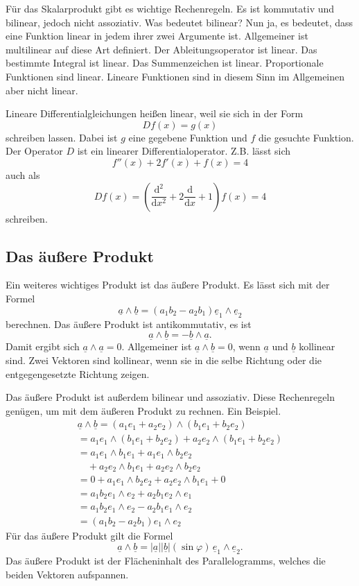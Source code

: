 \documentclass[a4paper,10pt,fleqn,twocolumn,twoside]{article}
\newcommand{\uv}[1]{\underline{#1}}
\begin{document}
Für das Skalarprodukt gibt es wichtige Rechenregeln. Es ist kommutativ
und bilinear, jedoch nicht assoziativ.
Was bedeutet bilinear? Nun ja, es bedeutet, dass eine Funktion linear
in jedem ihrer zwei Argumente ist. Allgemeiner ist multilinear auf
diese Art definiert. Der Ableitungsoperator ist linear. Das bestimmte
Integral ist linear. Das Summenzeichen ist linear. Proportionale
Funktionen sind linear. Lineare Funktionen sind in diesem Sinn im
Allgemeinen aber nicht linear.

Lineare Differentialgleichungen heißen linear,
weil sie sich in der Form
\[Df(x)=g(x)\]
schreiben lassen. Dabei ist $g$ eine gegebene Funktion und $f$
die gesuchte Funktion. Der Operator $D$ ist ein linearer
Differentialoperator. Z.B. lässt sich
\[f''(x) + 2f'(x) + f(x) = 4\]
auch als
\[Df(x) = \left(\frac{\mathrm d^2}{\mathrm dx^2}
+2\frac{\mathrm d}{\mathrm dx}
+1\right) f(x) = 4\]
schreiben.

\subsection{Das äußere Produkt}

Ein weiteres wichtiges Produkt ist das äußere Produkt.
Es lässt sich mit der Formel
\[\uv a\wedge\uv b
= (a_1b_2-a_2b_1)\uv e_1\wedge\uv e_2\]
berechnen. Das äußere Produkt ist antikommutativ, es ist
\[\uv a\wedge\uv b = -\uv b\wedge\uv a.\]
\noindent
Damit ergibt sich $\uv a\wedge\uv a = 0$.
Allgemeiner ist
$\uv a\wedge\uv b = 0$,
wenn $\uv a$ und $\uv b$ kollinear sind.
Zwei Vektoren sind kollinear, wenn sie in die selbe Richtung oder
die entgegengesetzte Richtung zeigen.

Das äußere Produkt ist außerdem bilinear und assoziativ.
Diese Rechenregeln genügen, um mit dem äußeren Produkt zu rechnen.
Ein Beispiel.
\begin{gather*}
\uv a\wedge\uv b
= (a_1e_1+a_2e_2) \wedge (b_1e_1+b_2e_2)\\
= a_1e_1\wedge (b_1e_1+b_2e_2) + a_2e_2\wedge (b_1e_1+b_2e_2)\\
= a_1e_1\wedge b_1e_1+a_1e_1\wedge b_2e_2\\
\quad + a_2e_2\wedge b_1e_1+a_2e_2\wedge b_2e_2\\
= 0+a_1e_1\wedge b_2e_2 + a_2e_2\wedge b_1e_1+0\\
= a_1b_2e_1\wedge e_2 + a_2b_1 e_2\wedge e_1\\
= a_1b_2e_1\wedge e_2 - a_2b_1 e_1\wedge e_2\\
= (a_1b_2-a_2b_1)e_1\wedge e_2
\end{gather*}
\noindent
Für das äußere Produkt gilt die Formel
\[\uv a\wedge\uv b= |\uv a||\uv b|
(\sin\varphi)\,\uv e_1\wedge\uv e_2.\]
\noindent
Das äußere Produkt ist der Flächeninhalt des Parallelogramms,
welches die beiden Vektoren aufspannen.
\end{document}

